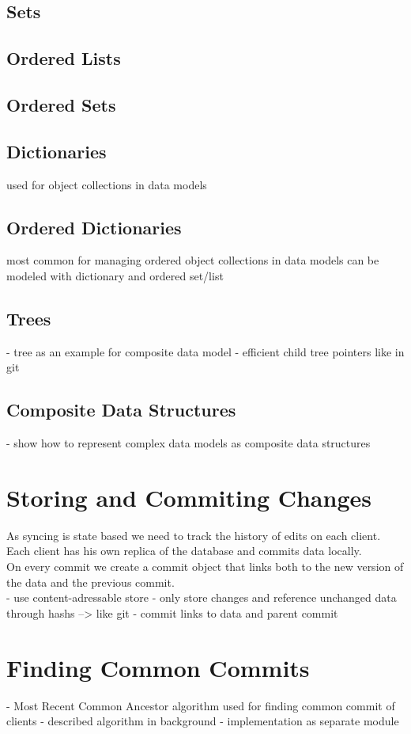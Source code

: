 \subsection{Sets}
\subsection{Ordered Lists}
\subsection{Ordered Sets}
\subsection{Dictionaries}
used for object collections in data models
\subsection{Ordered Dictionaries}
most common for managing ordered object collections in data models
can be modeled with dictionary and ordered set/list
\subsection{Trees}
- tree as an example for composite data model
- efficient child tree pointers like in git

\subsection{Composite Data Structures}
- show how to represent complex data models as composite data structures

\section{Storing and Commiting Changes}
As syncing is state based we need to track the history of edits on each client.\\Each client has his own replica of the database and commits
data locally.\\On every commit we create a commit object that links both
to the new version of the data and the previous commit.\\

- use content-adressable store
- only store changes and reference unchanged data through hashs --> like git
- commit links to data and parent commit

\section{Finding Common Commits}
- Most Recent Common Ancestor algorithm used for finding common commit of clients
- described algorithm in background
- implementation as separate module

